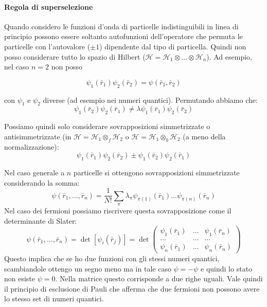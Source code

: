 \paragraph{Regola di superselezione} %
Quando considero le funzioni d'onda di particelle indistinguibili in linea di principio possono essere soltanto autofunzioni dell'operatore che permuta le particelle con l'autovalore ($\pm1$) dipendente dal tipo di particella.
Quindi non posso considerare tutto lo spazio di Hilbert ($\mathcal{H}=\mathcal{H}_1\otimes \dots \otimes \mathcal{H}_n$). Ad esempio, nel caso $n=2$ non posso 


\begin{equation}
\psi _1\left(\bar r_1\right)\psi _2\left(\bar r_2\right)=\psi \left(\bar r_1,\bar r_2\right)
\end{equation}

con $\psi_1$ e $\psi_2$ diverse (ad esempio nei numeri quantici). Permutando abbiamo che:
\begin{equation}
\psi _1\left(\bar r_2\right)\psi _2\left(\bar r_1\right)\neq \lambda \psi _1\left(\bar r_1\right)\psi _2\left(\bar r_2\right)
\end{equation}

Possiamo quindi solo considerare sovrapposizioni simmetrizzate o antisimmetrizzate (in $\mathcal{H}=\mathcal{H}_1\otimes_f \mathcal{H}_2$ o $\mathcal{H}=\mathcal{H}_1\otimes_b \mathcal{H}_2$ (a meno della normalizzazione):
\begin{equation}
\psi _1\left(\bar r_1\right)\psi _2\left(\bar r_2\right) \pm \psi _1\left(\bar r_2\right)\psi _2\left(\bar r_1\right) 
\end{equation}

Nel caso generale a $n$ particelle si ottengono sovrapposizioni simmetrizzate considerando la somma:
\begin{equation}
\psi \left(\bar r_1,\dots,\bar r_n\right)=\frac{1}{N!}\sum_{\pi} \lambda_{\pi} \psi_{\pi(1)} \left(\bar r_1\right) \dots \psi_{\pi(n)} \left(\bar r_n\right)
\end{equation}
Nel caso dei fermioni possiamo riscrivere questa sovrapposizione come il determinante di Slater:
\begin{equation}
\psi \left(\bar r_1,\dots,\bar r_n\right)=\det{\left[\psi _i\left(\bar r_j\right)\right]}=\det{\left(\begin{matrix}\psi _1\left(\bar r_1\right) & \dots & \psi _1\left(\bar r_n\right) \\ \dots & \dots & \dots \\ \psi _n\left(\bar r_1\right) & \dots & \psi _n\left(\bar r_n\right) \end{matrix}\right)}
\end{equation}
Questo implica che se ho due funzioni con gli stessi numeri quantici, scambiandole ottengo un segno meno ma in tale caso $\psi=-\psi$ e quindi lo stato non esiste $\psi=0$. Nella matrice questo corrisponde a due righe uguali. Vale quindi il principio di esclusione di Pauli che afferma che due fermioni non possono avere lo stesso set di numeri quantici.

